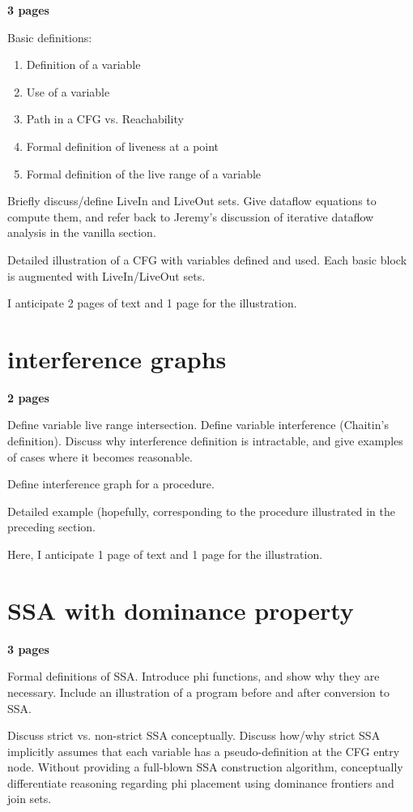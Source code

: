\textbf{3 pages}

Basic definitions:
\begin{enumerate}
\item Definition of a variable
\item Use of a variable
\item Path in a CFG vs. Reachability
\item Formal definition of liveness at a point
\item Formal definition of the live range of a variable
\end{enumerate}

Briefly discuss/define LiveIn and LiveOut
sets. Give dataflow equations to compute
them, and refer back to Jeremy's discussion
of iterative dataflow analysis in the vanilla section.

Detailed illustration of a CFG with
variables defined and used. Each basic block
is augmented with LiveIn/LiveOut sets. 

I anticipate 2 pages of text and 1 page
for the illustration.

\section{interference graphs}

\textbf{2 pages}

Define variable live range intersection. 
Define variable interference (Chaitin's definition). 
Discuss why interference definition is intractable,
and give examples of cases where it becomes 
reasonable.

Define interference graph for a procedure.

Detailed example (hopefully, corresponding to
the procedure illustrated in the preceding 
section. 

Here, I anticipate 1 page of text and 1 page
for the illustration.

\section{SSA with dominance property}

\textbf{3 pages}

Formal definitions of SSA. Introduce
phi functions, and show why they are
necessary. Include an illustration of
a program before and after conversion to SSA.

Discuss strict vs. non-strict SSA conceptually.
Discuss how/why strict SSA implicitly assumes
that each variable has a pseudo-definition at
the CFG entry node. Without providing a full-blown
SSA construction algorithm, conceptually differentiate
reasoning regarding phi placement using dominance 
frontiers and join sets. 

